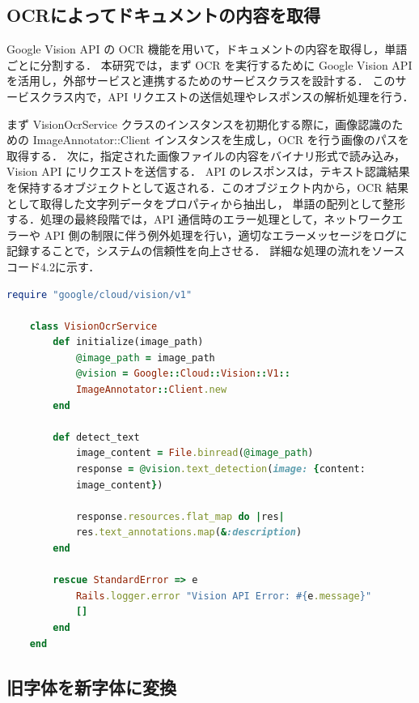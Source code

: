 \subsection{OCRによってドキュメントの内容を取得}
\label{subsec:app_ocr}

Google Vision API の OCR 機能を用いて，ドキュメントの内容を取得し，単語ごとに分割する．
本研究では，まず OCR を実行するために Google Vision API を活用し，外部サービスと連携するためのサービスクラスを設計する．
このサービスクラス内で，API リクエストの送信処理やレスポンスの解析処理を行う．

まず VisionOcrService クラスのインスタンスを初期化する際に，画像認識のための ImageAnnotator::Client インスタンスを生成し，OCR を行う画像のパスを取得する．
次に，指定された画像ファイルの内容をバイナリ形式で読み込み，Vision API にリクエストを送信する．
API のレスポンスは，テキスト認識結果を保持するオブジェクトとして返される．このオブジェクト内から，OCR 結果として取得した文字列データをプロパティから抽出し，
単語の配列として整形する．処理の最終段階では，API 通信時のエラー処理として，ネットワークエラーや API 側の制限に伴う例外処理を行い，適切なエラーメッセージをログに記録することで，システムの信頼性を向上させる．
詳細な処理の流れをソースコード4.2に示す．

\begin{lstlisting}[language=Ruby, caption=Ruby による OCR の実装]
    require "google/cloud/vision/v1"

    class VisionOcrService
        def initialize(image_path)
            @image_path = image_path
            @vision = Google::Cloud::Vision::V1::
            ImageAnnotator::Client.new
        end

        def detect_text
            image_content = File.binread(@image_path)
            response = @vision.text_detection(image: {content:
            image_content})

            response.resources.flat_map do |res|
            res.text_annotations.map(&:description)
        end

        rescue StandardError => e
            Rails.logger.error "Vision API Error: #{e.message}"
            []
        end
    end
\end{lstlisting}

\clearpage

\subsection{旧字体を新字体に変換}
\label{subsec:app_convert}

